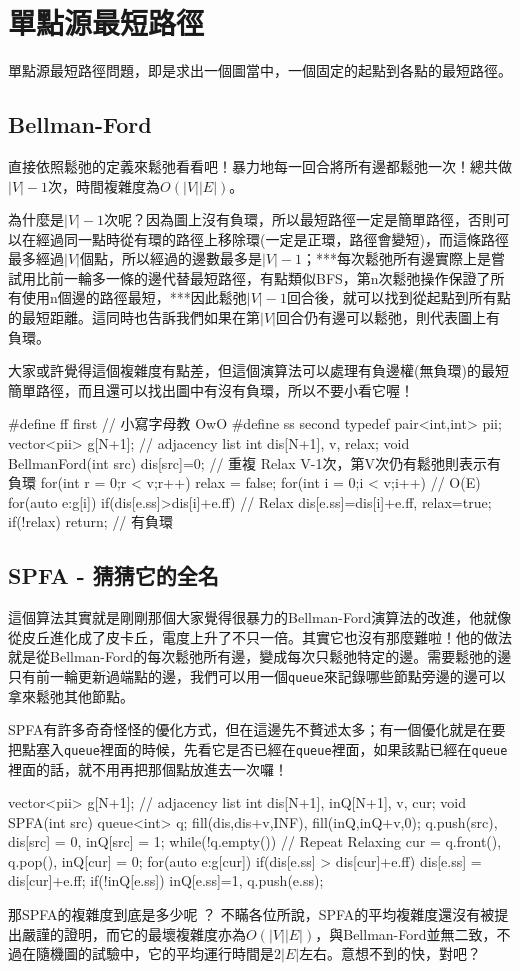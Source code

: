 \documentclass[main.tex]{subfiles}
\begin{document}
\section{單點源最短路徑}
單點源最短路徑問題，即是求出一個圖當中，一個固定的起點到各點的最短路徑。
\subsection{Bellman-Ford}
直接依照鬆弛的定義來鬆弛看看吧！暴力地每一回合將所有邊都鬆弛一次！總共做$|V|-1$次，時間複雜度為$O(|V||E|)$。

為什麼是$|V|-1$次呢？因為圖上沒有負環，所以最短路徑一定是簡單路徑，否則可以在經過同一點時從有環的路徑上移除環(一定是正環，路徑會變短)，而這條路徑最多經過$|V|$個點，所以經過的邊數最多是$|V|-1$；***每次鬆弛所有邊實際上是嘗試用比前一輪多一條的邊代替最短路徑，有點類似BFS，第n次鬆弛操作保證了所有使用n個邊的路徑最短，***因此鬆弛$|V|-1$回合後，就可以找到從起點到所有點的最短距離。這同時也告訴我們如果在第$|V|$回合仍有邊可以鬆弛，則代表圖上有負環。

大家或許覺得這個複雜度有點差，但這個演算法可以處理有負邊權(無負環)的最短簡單路徑，而且還可以找出圖中有沒有負環，所以不要小看它喔！ 
\begin{C++}
#define ff first // 小寫字母教 OwO
#define ss second
typedef pair<int,int> pii;
vector<pii> g[N+1]; // adjacency list
int dis[N+1], v, relax;
void BellmanFord(int src){
	dis[src]=0;
	// 重複 Relax V-1次，第V次仍有鬆弛則表示有負環
	for(int r = 0;r < v;r++){
		relax = false;
		for(int i = 0;i < v;i++) // O(E)
			for(auto e:g[i])
				if(dis[e.ss]>dis[i]+e.ff) // Relax
					dis[e.ss]=dis[i]+e.ff, relax=true;
		if(!relax) return;
	}
	// 有負環
}
\end{C++}

\subsection{SPFA - 猜猜它的全名}
這個算法其實就是剛剛那個大家覺得很暴力的Bellman-Ford演算法的改進，他就像從皮丘進化成了皮卡丘，電度上升了不只一倍。其實它也沒有那麼難啦！他的做法就是從Bellman-Ford的每次鬆弛所有邊，變成每次只鬆弛特定的邊。需要鬆弛的邊只有前一輪更新過端點的邊，我們可以用一個\texttt{queue}來記錄哪些節點旁邊的邊可以拿來鬆弛其他節點。

SPFA有許多奇奇怪怪的優化方式，但在這邊先不贅述太多；有一個優化就是在要把點塞入\texttt{queue}裡面的時候，先看它是否已經在\texttt{queue}裡面，如果該點已經在\texttt{queue}裡面的話，就不用再把那個點放進去一次囉！
\begin{C++}
vector<pii> g[N+1]; // adjacency list
int dis[N+1], inQ[N+1], v, cur;
void SPFA(int src){
	queue<int> q;
	fill(dis,dis+v,INF), fill(inQ,inQ+v,0);
	q.push(src), dis[src] = 0, inQ[src] = 1;
	while(!q.empty()){ // Repeat Relaxing
		cur = q.front(), q.pop(), inQ[cur] = 0;
		for(auto e:g[cur])
			if(dis[e.ss] > dis[cur]+e.ff){
				dis[e.ss] = dis[cur]+e.ff;
				if(!inQ[e.ss])
					inQ[e.ss]=1, q.push(e.ss);
			}
	}
}
\end{C++}
那SPFA的複雜度到底是多少呢 ？ 不瞞各位所說，SPFA的平均複雜度還沒有被提出嚴謹的證明，而它的最壞複雜度亦為$O(|V||E|)$，與Bellman-Ford並無二致，不過在隨機圖的試驗中，它的平均運行時間是$2|E|$左右。意想不到的快，對吧？
\end{document}
